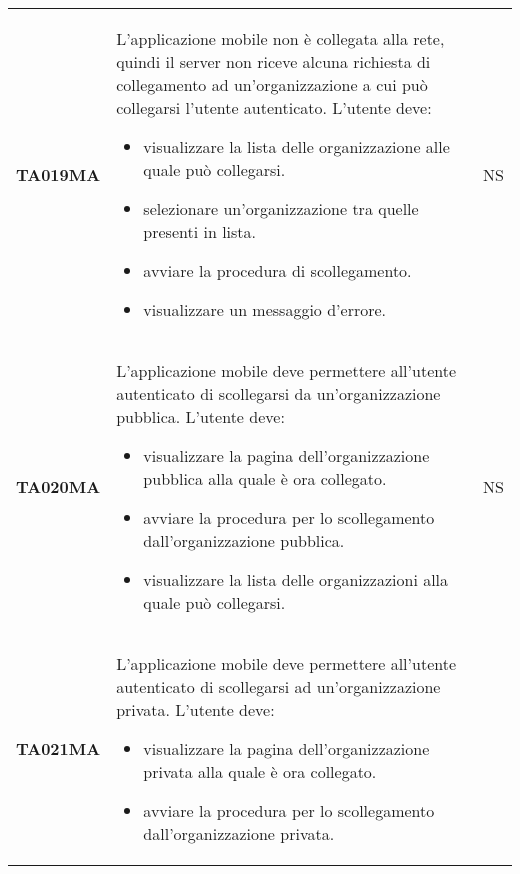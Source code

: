\documentclass[../../piano-di-qualifica.tex]{subfiles}
\begin{document}
\begin{longtable}[H]{>{\centering\bfseries}m{3cm} >{}m{10cm} >{\centering\arraybackslash}m{3cm}}
  TA019MA           & L'applicazione mobile non è collegata alla rete, quindi il server non riceve alcuna richiesta di collegamento ad un'organizzazione a cui può collegarsi l'utente autenticato. \newline
  L'utente deve:
  \begin{itemize}
    \item visualizzare la lista delle organizzazione alle quale può collegarsi.
    \item selezionare un'organizzazione tra quelle presenti in lista.
    \item avviare la procedura di scollegamento.
    \item visualizzare un messaggio d'errore.
  \end{itemize}
                    & NS                                                                                                                                                                                                                                                               \\
  TA020MA           & L'applicazione mobile deve permettere all'utente autenticato di scollegarsi da un'organizzazione pubblica. \newline
  L'utente deve:
  \begin{itemize}
    \item visualizzare la pagina dell'organizzazione pubblica alla quale è ora collegato.
    \item avviare la procedura per lo scollegamento dall'organizzazione pubblica.
    \item visualizzare la lista delle organizzazioni alla quale può collegarsi.
  \end{itemize}
                    & NS                                                                                                                                                                                                                                                               \\
  TA021MA           & L'applicazione mobile deve permettere all'utente autenticato di scollegarsi ad un'organizzazione privata. \newline
  L'utente deve:
  \begin{itemize}
    \item visualizzare la pagina dell'organizzazione privata alla quale è ora collegato.
    \item avviare la procedura per lo scollegamento dall'organizzazione privata.

\end{itemize}
\end{longtable}
\end{document}
